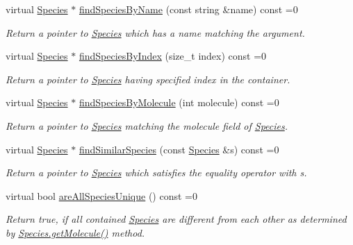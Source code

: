 \begin{DoxyCompactItemize}
virtual \hyperlink{classSpecies}{Species} $\ast$ \hyperlink{classSpeciesPtrContainerIFace_a5b97ea15e9bed033df91915749f2b127}{find\+Species\+By\+Name} (const string \&name) const =0
\begin{DoxyCompactList}\small\item\em Return a pointer to \hyperlink{classSpecies}{Species} which has a name matching the argument. \end{DoxyCompactList}\item 
virtual \hyperlink{classSpecies}{Species} $\ast$ \hyperlink{classSpeciesPtrContainerIFace_a7ffd588e38c333972be8a00e27eb8ebc}{find\+Species\+By\+Index} (size\+\_\+t index) const =0
\begin{DoxyCompactList}\small\item\em Return a pointer to \hyperlink{classSpecies}{Species} having specified index in the container. \end{DoxyCompactList}\item 
virtual \hyperlink{classSpecies}{Species} $\ast$ \hyperlink{classSpeciesPtrContainerIFace_ac354d14a8ea4c587acb57dca84ae87d6}{find\+Species\+By\+Molecule} (int molecule) const =0
\begin{DoxyCompactList}\small\item\em Return a pointer to \hyperlink{classSpecies}{Species} matching the molecule field of \hyperlink{classSpecies}{Species}. \end{DoxyCompactList}\item 
virtual \hyperlink{classSpecies}{Species} $\ast$ \hyperlink{classSpeciesPtrContainerIFace_aec7587e277efd806e327b5f32e8b8b0e}{find\+Similar\+Species} (const \hyperlink{classSpecies}{Species} \&s) const =0
\begin{DoxyCompactList}\small\item\em Return a pointer to \hyperlink{classSpecies}{Species} which satisfies the equality operator with s. \end{DoxyCompactList}\item 
virtual bool \hyperlink{classSpeciesPtrContainerIFace_a701ad0d3c0991bf124d45c9219d6afb1}{are\+All\+Species\+Unique} () const =0
\begin{DoxyCompactList}\small\item\em Return true, if all contained \hyperlink{classSpecies}{Species} are different from each other as determined by \hyperlink{classSpecies_a1ea8969c51bc69879891a408f9e197c7}{Species.\+get\+Molecule()} method. \end{DoxyCompactList}\item 

\end{DoxyCompactItemize}
